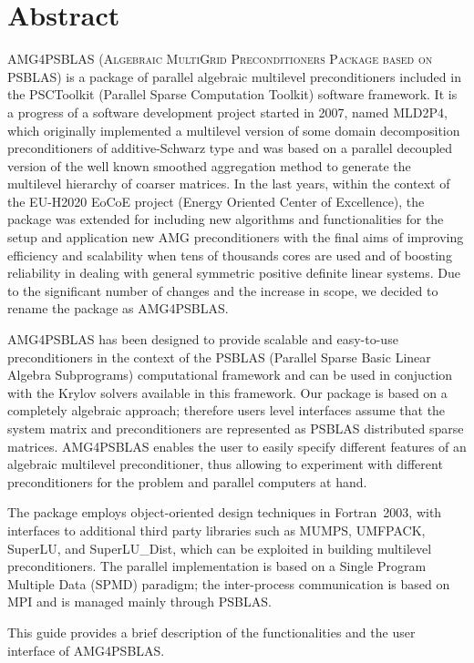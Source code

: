 \section*{Abstract}
\ifpdf
{}
\fi

\textsc{AMG4PSBLAS (Algebraic MultiGrid Preconditioners Package
based on PSBLAS}) is a package of parallel algebraic multilevel preconditioners included in the PSCToolkit (Parallel Sparse Computation Toolkit) software framework.
It is a progress of a software development project started in 2007, named MLD2P4, which originally implemented a 
multilevel version of some domain decomposition preconditioners of additive-Schwarz type and was based on a parallel decoupled version of the well known smoothed
aggregation method to generate the multilevel hierarchy of coarser matrices. 
In the last years, within the context of the EU-H2020 EoCoE project (Energy Oriented Center of Excellence), the package was extended for including new algorithms and 
functionalities for the  setup and application new AMG preconditioners with the final aims of improving efficiency and scalability when tens of thousands cores are
used and of boosting reliability in dealing with general symmetric positive definite linear systems. 
Due to the significant number of changes and the increase in scope, we decided to rename the package as AMG4PSBLAS.

AMG4PSBLAS has been designed to provide scalable and easy-to-use preconditioners
in the context of the PSBLAS (Parallel Sparse Basic Linear Algebra Subprograms)
computational framework and can be used in conjuction with the Krylov solvers
available in this framework.
Our package is based on a completely algebraic approach; therefore
users level interfaces assume that the system matrix and
preconditioners are represented as PSBLAS distributed sparse matrices.
AMG4PSBLAS enables the user to easily specify different
features of an algebraic multilevel preconditioner, thus allowing to experiment
with different preconditioners for the problem and parallel computers at hand.

The package employs object-oriented design techniques in
Fortran~2003, with interfaces to additional third party libraries
such as MUMPS, UMFPACK, SuperLU, and SuperLU\_Dist, which
can be exploited in building multilevel preconditioners. The parallel
implementation is based on a Single Program Multiple Data (SPMD)
paradigm; the inter-process communication is based on MPI and
is managed mainly through PSBLAS.

This guide provides a brief description of the functionalities and
the user interface of AMG4PSBLAS. 
